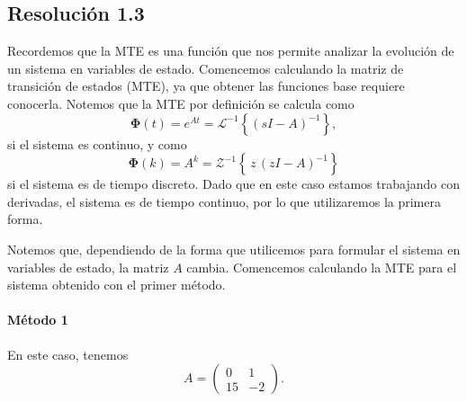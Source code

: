 \documentclass[
  11pt,
  letterpaper,
   addpoints,
   answers
  ]{exam}
\begin{document}
\begin{questions}
\begin{solution}
\subsection*{Resolución 1.3}
Recordemos que la MTE es una función que nos permite analizar la evolución de un sistema en variables de estado. Comencemos calculando la matriz de transición de estados (MTE), ya que obtener las funciones base requiere conocerla.
Notemos que la MTE por definición se calcula como
\setcounter{equation}{26}
\begin{equation}
\boldsymbol{\Phi}(t)=e^{At}=\mathcal{L}^{-1}\!\left\{(sI-A)^{-1}\right\},
\end{equation}
si el sistema es continuo, y como
\begin{equation}
\boldsymbol{\Phi}(k)=A^k=\mathcal{Z}^{-1}\!\left\{\,z\,(zI-A)^{-1}\right\}
\end{equation}
si el sistema es de tiempo discreto. Dado que en este caso estamos trabajando con derivadas, el
sistema es de tiempo continuo, por lo que utilizaremos la primera forma.

Notemos que, dependiendo de la forma que utilicemos para formular el sistema en variables de
estado, la matriz $A$ cambia. Comencemos calculando la MTE para el sistema obtenido con
el primer método.

\paragraph{Método 1}
En este caso, tenemos
\begin{equation}
A=\begin{pmatrix}
0 & 1\\
15 & -2
\end{pmatrix}.
\end{equation}


\end{solution}
\end{questions}
\end{document}
